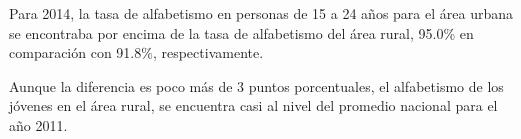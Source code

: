 Para 2014, la tasa de alfabetismo en personas de 15 a 24 años para el área urbana se encontraba por encima de la tasa de alfabetismo del área rural, 95.0\% en comparación con 91.8\%, respectivamente. 
 
Aunque la diferencia es poco más de 3 puntos porcentuales, el alfabetismo de los jóvenes en el área rural, se encuentra casi al nivel del promedio nacional para el año 2011.    